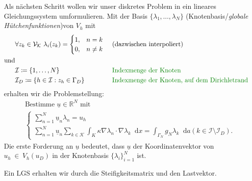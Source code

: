 \documentclass[12pt,a4paper]{scrartcl}
\newcommand{\R}{\mathbb{R}}
\newcommand*\diff{\mathop{}\!\mathrm{d}}
\newcommand{\defi}[1]{\textcolor{Mygreen}{#1}}
\numberwithin{equation}{section}
\begin{document}
\begin{enumerate}[label=(\roman*)]
Als nächsten Schritt wollen wir unser diskretes Problem in ein lineares Gleichungssystem umformulieren. 
	Mit der Basis $ \{\lambda_1, \dots , \lambda_N\} $ (\defi{Knotenbasis}/\emph{globale Hütchenfunktionen})von $V_h$ mit
	\begin{align*}
		&\forall z_k \in \mathcal{V}_\mathcal{K} \ \lambda_i(z_k) = 
		\begin{cases}
			1, &n=k\\
			0, &n\neq k
		\end{cases}
		\ &&(\text{dazwischen interpoliert})\\
	\text{und} \\
		&\mathcal{I} \coloneqq \{ 1, \dots , N \}  &&\text{\defi{Indexmenge der Knoten}} \\
		&\mathcal{I}_D \coloneqq \{ h \in \mathcal{I} : z_h \in \Gamma_D \}  &&\text{\defi{Indexmenge der Knoten, auf dem Dirichletrand }}
	\end{align*}
	erhalten wir die Problemstellung:
	\begin{align*}
		&\text{Bestimme } \underline{u} \in \R^N \text{ mit }\\
		&\begin{cases}
			\sum_{n = 1}^N \underline{u}_n \lambda_n = u_h  \\
			\sum_{n=1}^{N} \underline{u}_n \sum_{k \in \mathcal{K}} \int_{K} \kappa \nabla \lambda_n \cdot \nabla \lambda_k \diff x = \int_{\Gamma_N} g_N \lambda_k \diff a (k \in \mathcal{I}\setminus\mathcal{I}_D).
		\end{cases}
	\end{align*}
	Die erste Forderung an $ \underline{u} $ bedeutet, dass $\underline{u} $ der Koordinatenvektor von $ u_h~\in~V_h(u_D) $ in der Knotenbasis  $ \{ \lambda_i \}_{i = 1}^N $ ist.
	
	Ein LGS erhalten wir durch die Steifigkeitsmatrix und den Lastvektor. 
	

\end{enumerate}
\end{document}
